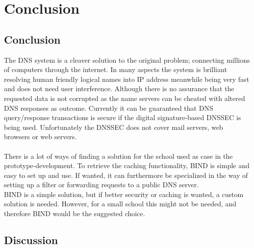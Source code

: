 \documentclass[Main]{subfiles}
\begin{document}
\chapter{Conclusion}

\section{Conclusion}

The DNS system is a cleaver solution to the original problem; connecting millions of computers through the internet.
In many aspects the system is brilliant resolving human friendly logical names into IP address meanwhile being very fast and does not need user interference. Although there is no assurance that the requested data is not corrupted as the name servers can be cheated with altered DNS responses as outcome. Currently it can be guaranteed that DNS query/response transactions is secure if the digital signature-based DNSSEC is being used. Unfortunately the DNSSEC does not cover mail servers, web browsers or web servers.
\\
\\
There is a lot of ways of finding a solution for the school used as case in the prototype-development.
To retrieve the caching functionality, BIND is simple and easy to set up and use. 
If wanted, it can furthermore be specialized in the way of setting up a filter or forwarding requests to a public DNS server.  
\\
BIND is a simple solution, but if better security or caching is wanted, a custom solution is needed. However, for a small school this might not be needed, and therefore BIND would be the suggested choice.


\section{Discussion}
\end{document}
